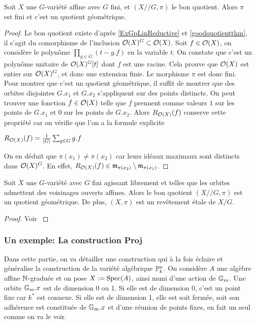 \begin{prop}\label{GITEtaleFiniteGroup}
Soit $X$ une $G$-variété affine avec $G$ fini, et $(X//G,\pi)$ le bon quotient. Alors $\pi$ est fini et c'est un quotient géométrique.
\end{prop}
\begin{proof}
Le bon quotient existe d'après \ref{ExGpLinReductive} et \ref{goodquotientthm}, il s'agit du comorphisme de l'inclusion $\mathcal{O}(X)^G\subset \mathcal{O}(X)$. Soit $f\in\mathcal{O}(X)$, on considère le polynôme $\prod_{g\in G}(t-g.f)$ en la variable $t$. On constate que c'est un polynôme unitaire de $\mathcal{O}(X)^G[t]$ dont $f$ est une racine. Cela prouve que $\mathcal{O}(X)$ est entier sur $\mathcal{O}(X)^G$, et donc une extension finie. Le morphisme $\pi$ est donc fini. Pour montrer que c'est un quotient géométrique, il suffit de montrer que des orbites disjointes $G.x_1$ et $G.x_2$ s'appliquent sur des points distincts. On peut trouver une fonction $f\in\mathcal{O}(X)$ telle que $f$ prennent comme valeurs $1$ sur les points de $G.x_1$ et $0$ sur les points de $G.x_2$. Alors $R_{\mathcal{O}(X)}(f)$ conserve cette propriété car on vérifie que l'on a la formule explicite
\begin{center}
$R_{\mathcal{O}(X)}(f)=\frac{1}{|G|}\sum_{g\in G}g.f$
\end{center}
On en déduit que $\pi(x_1)\neq\pi(x_2)$ car leurs idéaux maximaux sont distincts dans $\mathcal{O}(X)^G$. En effet, $R_{\mathcal{O}(X)}(f)\in \mathfrak{m}_{\pi(x_2)}\setminus \mathfrak{m}_{\pi(x_1)}$.
\end{proof}

\begin{prop}\label{GITEtaleFiniteGroup}
Soit $X$ une $G$-variété avec $G$ fini agissant librement et telles que les orbites admettent des voisinages ouverts affines. Alors le bon quotient $(X//G,\pi)$ est un quotient géométrique. De plus, $(X,\pi)$ est un revêtement étale de $X/G$.
\end{prop}
\begin{proof}
Voir \cite[II.7]{MumfordAbelianVarieties}
\end{proof}

\subsubsection{Un exemple: La construction Proj}
\label{ProjConstruction}
Dans cette partie, on va détailler une construction qui à la fois éclaire et généralise la construction de la variété algébrique $\mathbb{P}^n_k$. On considère $A$ une algèbre affine $\mathbb{N}$-graduée et on pose $X:=\operatorname{Spec}(A)$, ainsi muni d'une action de $\mathbb{G}_m$. Une orbite $\mathbb{G}_m.x$ est de dimension 0 ou 1. Si elle est de dimension 0, c'est un point fixe car $k^*$ est connexe. Si elle est de dimension 1, elle est soit fermée, soit son adhérence est constituée de $\mathbb{G}_m.x$  et d'une réunion de points fixes, en fait un seul comme on va le voir.

